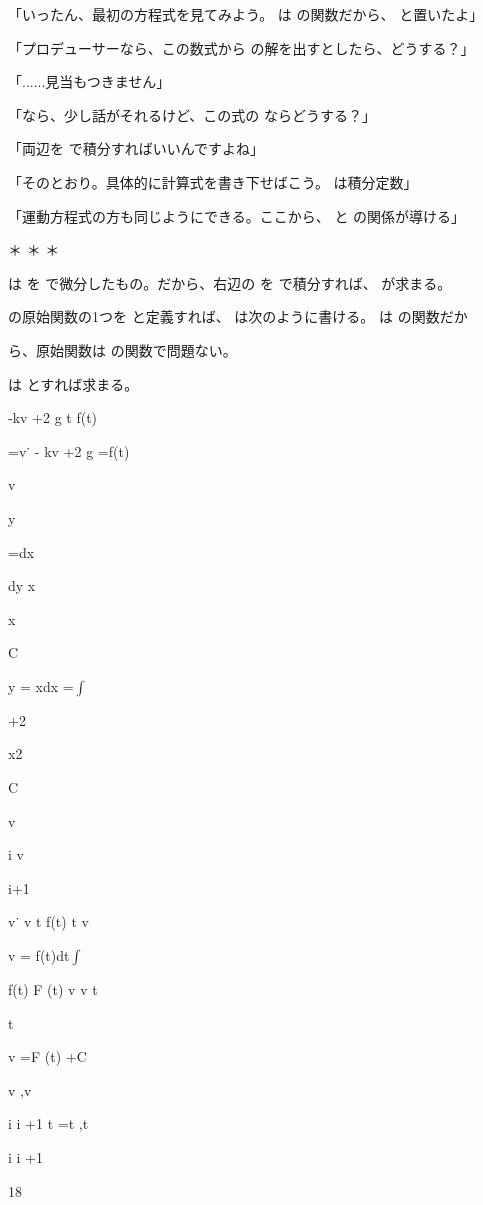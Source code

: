 「いったん、最初の⽅程式を⾒てみよう。 は の関数だから、 と置いたよ」\par
「プロデューサーなら、この数式から の解を出すとしたら、どうする？」\par
「......⾒当もつきません」\par
「なら、少し話がそれるけど、この式の ならどうする？」\par
「両辺を で積分すればいいんですよね」\par
「そのとおり。具体的に計算式を書き下せばこう。 は積分定数」\par
「運動⽅程式の⽅も同じようにできる。ここから、 と の関係が導ける」\par
＊ ＊ ＊\par
は を で微分したもの。だから、右辺の を で積分すれば、 が求まる。\par
の原始関数の1つを と定義すれば、 は次のように書ける。 は の関数だか\par
ら、原始関数は の関数で問題ない。\par
は とすれば求まる。\par
-kv +2 g t f(t)\par
=v˙ - kv +2 g =f(t)\par
v\par
y\par
=dx\par
dy x\par
x\par
C\par
y = xdx =$\int$\par
+2\par
x2\par
C\par
v\par
i v\par
i+1\par
v˙ v t f(t) t v\par
v = f(t)dt$\int$\par
f(t) F (t) v v t\par
t\par
v =F (t) +C\par
v  ,v\par
i i +1 t =t  ,t\par
i i +1\par
18\par

